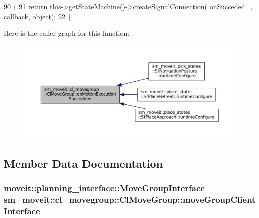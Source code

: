\begin{DoxyCode}
90   \{
91     \textcolor{keywordflow}{return} this->\hyperlink{classsmacc_1_1ISmaccClient_aec51d4712404cb9882b86e4c854bb93a}{getStateMachine}()->\hyperlink{classsmacc_1_1ISmaccStateMachine_adf0f42ade0c65cc471960fe2a7c42da2}{createSignalConnection}(
      \hyperlink{classsm__moveit_1_1cl__movegroup_1_1ClMoveGroup_ad0a02fb564967bae0808c966dd1e3c36}{onSucceded\_}, callback, \textcolor{keywordtype}{object});
92   \}
\end{DoxyCode}


Here is the caller graph for this function\+:
\nopagebreak
\begin{figure}[H]
\begin{center}
\leavevmode
\includegraphics[width=350pt]{classsm__moveit_1_1cl__movegroup_1_1ClMoveGroup_a5359b864e258cb51d0d7ff7ffc615b58_icgraph}
\end{center}
\end{figure}




\subsection{Member Data Documentation}
\subsubsection[{\texorpdfstring{move\+Group\+Client\+Interface}{moveGroupClientInterface}}]{\setlength{\rightskip}{0pt plus 5cm}moveit\+::planning\+\_\+interface\+::\+Move\+Group\+Interface sm\+\_\+moveit\+::cl\+\_\+movegroup\+::\+Cl\+Move\+Group\+::move\+Group\+Client\+Interface}\hypertarget{classsm__moveit_1_1cl__movegroup_1_1ClMoveGroup_a23acf6883455566dbab30e4367c2144d}{}\label{classsm__moveit_1_1cl__movegroup_1_1ClMoveGroup_a23acf6883455566dbab30e4367c2144d}


